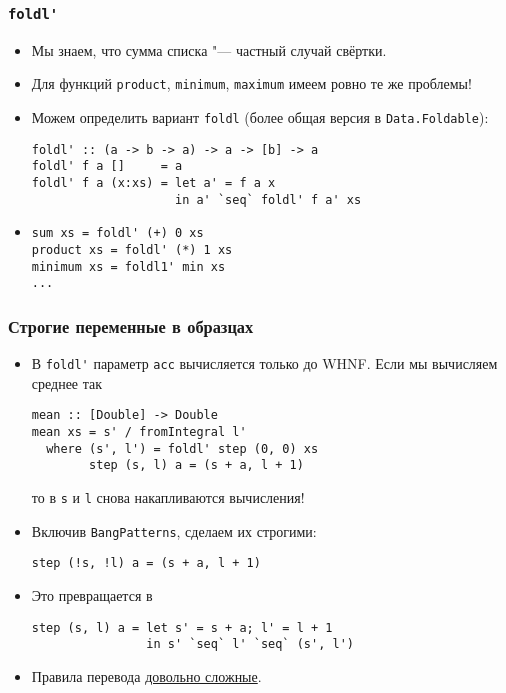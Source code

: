\documentclass[11pt]{beamer}
\begin{document}
\begin{frame}[fragile]
  \frametitle{\lstinline|foldl'|}
  \begin{itemize}
    \item Мы знаем, что сумма списка "--- частный случай свёртки.
    \item Для функций \lstinline|product|, \lstinline|minimum|, \lstinline|maximum| имеем ровно те же проблемы!
    \item Можем определить вариант \lstinline|foldl| (более общая версия в \lstinline|Data.Foldable|):
          \begin{lstlisting}[basicstyle=\ttfamily\small]
foldl' :: (a -> b -> a) -> a -> [b] -> a
foldl' f a []     = a
foldl' f a (x:xs) = let a' = f a x
                    in a' `seq` foldl' f a' xs
\end{lstlisting}
    \item \pause
          \begin{lstlisting}
sum xs = foldl' (+) 0 xs
product xs = foldl' (*) 1 xs
minimum xs = foldl1' min xs
...
\end{lstlisting}
  \end{itemize}
\end{frame}

\begin{frame}[fragile]
  \frametitle{Строгие переменные в образцах}
  \begin{itemize}
    \item В \lstinline|foldl'| параметр \lstinline|acc| вычисляется только до WHNF. Если мы вычисляем среднее так
          \begin{lstlisting}[basicstyle=\ttfamily\footnotesize]
mean :: [Double] -> Double
mean xs = s' / fromIntegral l'
  where (s', l') = foldl' step (0, 0) xs
        step (s, l) a = (s + a, l + 1)
\end{lstlisting}
          то в \lstinline|s| и \lstinline|l| снова накапливаются вычисления!
          \pause
    \item Включив \lstinline|BangPatterns|, сделаем их строгими:
          \begin{lstlisting}[escapeinside=||,basicstyle=\ttfamily\footnotesize]
step (!s, !l) a = (s + a, l + 1)
\end{lstlisting}
    \item Это превращается в
          \begin{lstlisting}[basicstyle=\ttfamily\footnotesize]
step (s, l) a = let s' = s + a; l' = l + 1
                in s' `seq` l' `seq` (s', l')
\end{lstlisting}
    \item Правила перевода \href{https://downloads.haskell.org/~ghc/8.6.3/docs/html/users_guide/glasgow_exts.html#recursive-and-polymorphic-let-bindings}{довольно сложные}.
  \end{itemize}
\end{frame}
\end{document}
